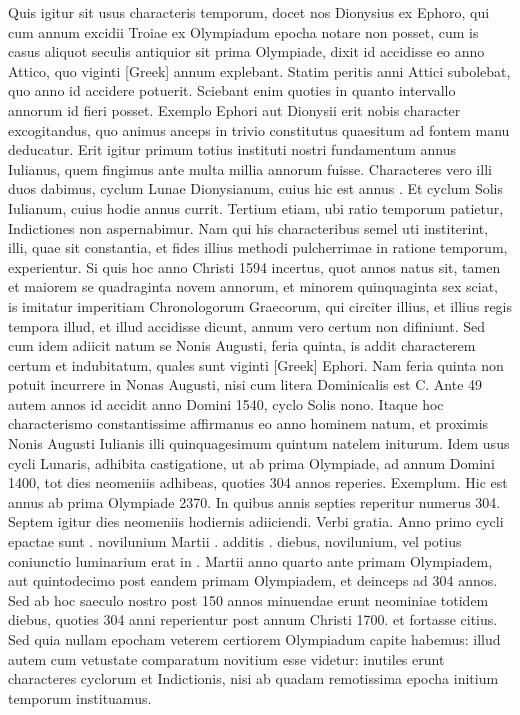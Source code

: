 Quis igitur sit usus characteris temporum, docet nos
Dionysius ex Ephoro, qui cum annum excidii Troiae ex Olympiadum
epocha notare non posset, cum is casus aliquot seculis antiquior
sit prima Olympiade, dixit id accidisse eo anno Attico, quo viginti
\textgreek{[Greek]} annum explebant.
Statim peritis anni Attici subolebat,
quo anno id accidere potuerit.
Sciebant enim quoties in quanto
intervallo annorum id fieri posset.
Exemplo Ephori aut Dionysii
erit nobis character excogitandus, quo animus anceps in trivio constitutus
quaesitum ad fontem manu deducatur.
Erit igitur primum
totius instituti nostri fundamentum annus Iulianus, quem fingimus
ante multa millia annorum fuisse.
Characteres vero illi duos dabimus,
cyclum Lunae Dionysianum, cuius hic est annus .
Et cyclum
Solis Iulianum, cuius hodie annus  currit.
Tertium etiam,
ubi ratio temporum patietur, Indictiones non aspernabimur.
Nam
qui his characteribus semel uti institerint, illi,
 quae sit constantia, et fides
illius methodi pulcherrimae in ratione temporum, experientur.
Si
quis hoc anno Christi 1594 incertus, quot annos natus sit, tamen et
maiorem se quadraginta novem annorum, et minorem quinquaginta
sex sciat, is imitatur imperitiam Chronologorum Graecorum, qui
circiter illius, et illius regis tempora illud,
 et illud accidisse dicunt, annum
vero certum non difiniunt.
Sed cum idem adiicit natum se Nonis
Augusti, feria quinta, is addit characterem certum et indubitatum,
quales sunt viginti \textgreek{[Greek]} Ephori.
Nam feria quinta non
potuit incurrere in Nonas Augusti, nisi cum litera Dominicalis est C.
Ante 49 autem annos id accidit anno Domini 1540, cyclo Solis nono.
Itaque hoc characterismo constantissime affirmanus eo anno hominem
natum, et proximis Nonis Augusti Iulianis illi quinquagesimum
quintum natelem initurum.
Idem usus cycli Lunaris, adhibita
castigatione, ut ab prima Olympiade, ad annum Domini 1400, tot
dies neomeniis adhibeas, quoties 304 annos reperies.
Exemplum.
Hic est annus ab prima Olympiade 2370.
In quibus annis septies reperitur
numerus 304.
Septem igitur dies neomeniis hodiernis adiiciendi.
Verbi gratia.
Anno primo cycli epactae sunt . novilunium
Martii . additis
 . diebus, novilunium, vel potius coniunctio
luminarium erat in .
Martii anno quarto ante primam Olympiadem,
aut quintodecimo post eandem primam Olympiadem, et deinceps
ad 304 annos.
Sed ab hoc saeculo nostro post 150 annos minuendae
erunt neominiae totidem diebus, quoties 304 anni reperientur
post annum Christi 1700. et fortasse citius.
Sed quia nullam epocham
veterem certiorem Olympiadum capite habemus: illud autem
cum vetustate comparatum novitium esse videtur: inutiles erunt characteres
cyclorum et Indictionis, nisi ab quadam remotissima epocha
initium temporum instituamus.

